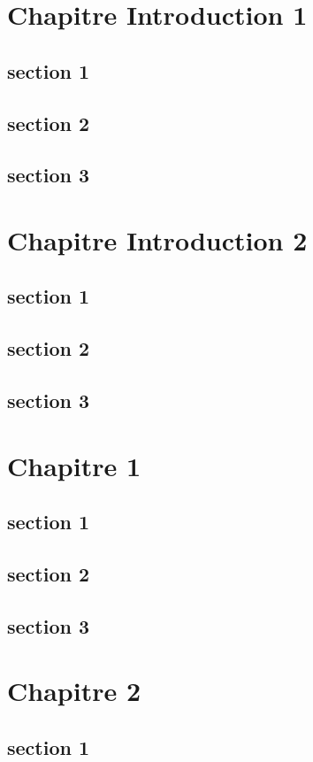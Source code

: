 \documentclass[10pt,a4paper]{book}
\begin{document}
\frontmatter
\tableofcontents
\setcounter{chapter}{1}
\chapter{Chapitre Introduction 1}
\section{section 1}
\section{section 2}
\section{section 3}
\chapter{Chapitre Introduction 2}
\section{section 1}
\section{section 2}
\section{section 3}

\mainmatter

\chapter{Chapitre  1}
\section{section 1}
\section{section 2}
\section{section 3}
\chapter{Chapitre  2}
\section{section 1}
\end{document}
